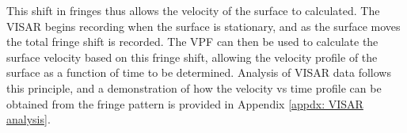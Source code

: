 This shift in fringes thus allows the velocity of the surface to calculated. The VISAR begins recording when the surface is stationary, and as the surface moves the total fringe shift is recorded. The VPF can then be used to calculate the surface velocity based on this fringe shift, allowing the velocity profile of the surface as a function of time to be determined. Analysis of VISAR data follows this principle, and a demonstration of how the velocity vs time profile can be obtained from the fringe pattern is provided in Appendix \ref{appdx: VISAR analysis}.






